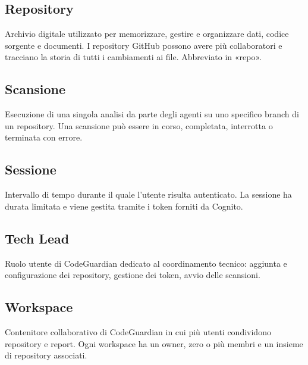 \documentclass[a4paper, 11pt]{article}
\begin{document}
\subsection{Repository}
Archivio digitale utilizzato per memorizzare, gestire e organizzare dati, codice sorgente e documenti. I repository GitHub possono avere più collaboratori e tracciano la storia di tutti i cambiamenti ai file. Abbreviato in «repo».

\subsection{Scansione}
Esecuzione di una singola analisi da parte degli agenti su uno specifico branch di un repository. Una scansione può essere in corso, completata, interrotta o terminata con errore.

\subsection{Sessione}
Intervallo di tempo durante il quale l'utente risulta autenticato. La sessione ha durata limitata e viene gestita tramite i token forniti da Cognito.

\subsection{Tech Lead}
Ruolo utente di CodeGuardian dedicato al coordinamento tecnico: aggiunta e configurazione dei repository, gestione dei token, avvio delle scansioni.

\subsection{Workspace}
Contenitore collaborativo di CodeGuardian in cui più utenti condividono repository e report. Ogni workspace ha un owner, zero o più membri e un insieme di repository associati.
\end{document}
